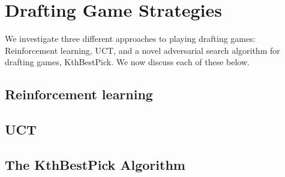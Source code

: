 \documentclass[letterpaper]{article}
\numberwithin{equation}{section}
\numberwithin{theorem}{section}
\numberwithin{lemma}{section}
\numberwithin{df}{section}
\begin{document}
\section{Drafting Game Strategies}
\label{sec:drafting}

We investigate three different approaches to playing drafting games: Reinforcement learning, UCT, and a novel adversarial search algorithm for drafting games, KthBestPick.  We now discuss each of these below.

\subsection{Reinforcement learning}


\subsection{UCT}



\subsection{The KthBestPick Algorithm}
\label{sec:KthBestPick}
\end{document}
